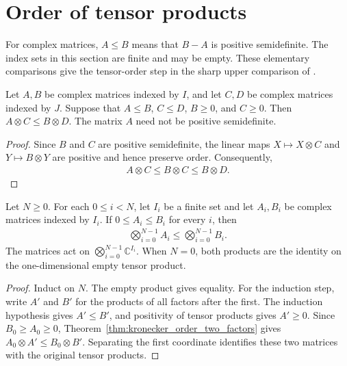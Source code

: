 \section{Order of tensor products}

For complex matrices, $A\le B$ means that $B-A$ is positive semidefinite.
The index sets in this section are finite and may be empty.
These elementary comparisons give the tensor-order step in the sharp upper
comparison of \cite[Section~8]{OpenAI2026AreaLaw}.

\begin{theorem}
    \label{thm:kronecker_order_two_factors}
    \leanok
    Let $A,B$ be complex matrices indexed by $I$, and let $C,D$ be complex
    matrices indexed by $J$. Suppose that $A\le B$, $C\le D$, $B\ge0$, and
    $C\ge0$. Then $A\otimes C\le B\otimes D$.
    The matrix $A$ need not be positive semidefinite.
\end{theorem}

\begin{proof}
    \leanok
    Since $B$ and $C$ are positive semidefinite, the linear maps
    $X\mapsto X\otimes C$ and $Y\mapsto B\otimes Y$ are positive and hence
    preserve order. Consequently,
    \begin{align}
        A\otimes C\le B\otimes C\le B\otimes D.
    \end{align}
\end{proof}

\begin{theorem}
    \label{thm:finite_kronecker_order}
    \leanok
    Let $N\ge0$. For each $0\le i<N$, let $I_i$ be a finite set and let
    $A_i,B_i$ be complex matrices indexed by $I_i$.
    If $0\le A_i\le B_i$ for every $i$, then
    \begin{align}
        \bigotimes_{i=0}^{N-1}A_i\le\bigotimes_{i=0}^{N-1}B_i.
    \end{align}
    The matrices act on $\bigotimes_{i=0}^{N-1}\mathbb C^{I_i}$.
    When $N=0$, both products are the identity on the one-dimensional
    empty tensor product.
\end{theorem}

\begin{proof}
    \leanok
    Induct on $N$. The empty product gives equality. For the induction
    step, write $A'$ and $B'$ for the products of all factors after the
    first. The induction hypothesis gives $A'\le B'$, and positivity of
    tensor products gives $A'\ge0$. Since $B_0\ge A_0\ge0$,
    Theorem~\ref{thm:kronecker_order_two_factors} gives
    $A_0\otimes A'\le B_0\otimes B'$. Separating the first coordinate
    identifies these two matrices with the original tensor products.
\end{proof}

